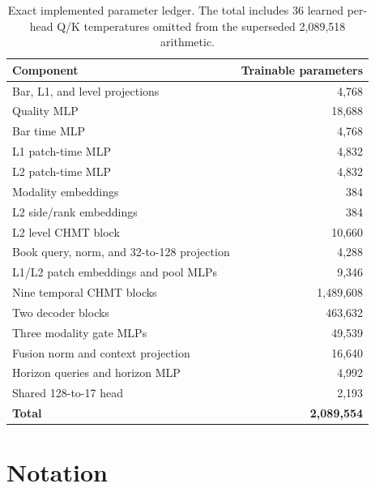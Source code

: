 \documentclass[10pt,letterpaper]{article}
\numberwithin{equation}{section}
\theoremstyle{definition}
\theoremstyle{remark}
\begin{document}
\begin{table}[H]
\centering
\small
\begin{tabular}{@{}lr@{}}
\toprule
\textbf{Component} & \textbf{Trainable parameters}\\
\midrule
Bar, L1, and level projections & 4,768\\
Quality MLP & 18,688\\
Bar time MLP & 4,768\\
L1 patch-time MLP & 4,832\\
L2 patch-time MLP & 4,832\\
Modality embeddings & 384\\
L2 side/rank embeddings & 384\\
L2 level CHMT block & 10,660\\
Book query, norm, and 32-to-128 projection & 4,288\\
L1/L2 patch embeddings and pool MLPs & 9,346\\
Nine temporal CHMT blocks & 1,489,608\\
Two decoder blocks & 463,632\\
Three modality gate MLPs & 49,539\\
Fusion norm and context projection & 16,640\\
Horizon queries and horizon MLP & 4,992\\
Shared 128-to-17 head & 2,193\\
\midrule
\textbf{Total} & \textbf{2,089,554}\\
\bottomrule
\end{tabular}
\caption{Exact implemented parameter ledger. The total includes 36 learned
per-head Q/K temperatures omitted from the superseded 2,089,518 arithmetic.}
\label{tab:parameters}
\end{table}

\section{Notation}
\end{document}

